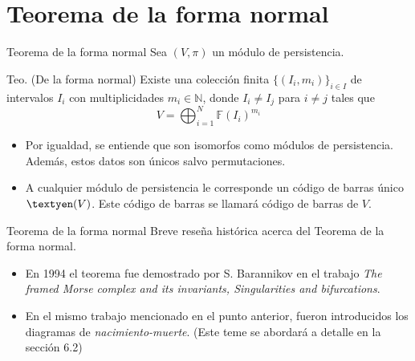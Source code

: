 \documentclass{beamer}
\begin{document}
\section{Teorema de la forma normal}
\begin{frame}{Teorema de la forma normal}
    Sea $(V, \pi)$ un módulo de persistencia.
    
    \begin{block}{Teo. (De la forma normal)}
         Existe una colección finita $\{(I_{i} , m_{i})\}_{i\in I}$ de intervalos $I_{i}$ con multiplicidades $m_{i} \in \mathbb{N}$, donde $I_{i}\neq I_{j}$ para $i \neq j$ tales que 
         $$V = \bigoplus_{i=1}^{N} \mathbb{F}(I_i)^{m_i}$$
    \end{block}
    \pause
    
    \begin{itemize}
        \item Por igualdad, se entiende que son isomorfos como módulos de persistencia. Además, estos datos son únicos salvo permutaciones.
        \pause
        
        \item A cualquier módulo de persistencia le corresponde un código de barras único $\textyen(V)$. Este código de barras se llamará código de barras de $V$.
    \end{itemize}
    
\end{frame}

\begin{frame}{Teorema de la forma normal}
    Breve reseña histórica acerca del Teorema de la forma normal.

    \begin{itemize}
        \item En 1994 el teorema fue demostrado por 
        S. Barannikov en el trabajo \textit{The framed Morse complex and its invariants, Singularities and bifurcations}.
        \pause

        \item En el mismo trabajo mencionado en el punto anterior, fueron introducidos los diagramas de \textit{nacimiento-muerte}. (Este teme se abordará a detalle en la sección 6.2)
         
    \end{itemize}
    
\end{frame}
\end{document}
